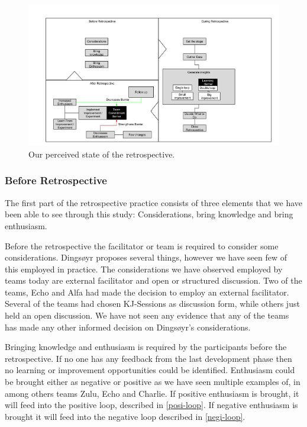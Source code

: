 \begin{figure}
	\centering
	\includegraphics[width=\textwidth, keepaspectratio]{figures/retro-outcome.png}
	\caption{Our perceived state of the retrospective.}
	\label{figure:retro-current-state}
\end{figure}

\subsubsection{Before Retrospective}
The first part of the retrospective practice consists of three elements that we have been able to see through this study: Considerations, bring knowledge and bring enthusiasm. 

Before the retrospective the facilitator or team is required to consider some considerations. Dingsøyr \cite{Dingsoyr2004} proposes several things, however we have seen few of this employed in practice. The considerations we have observed employed by teams today are external facilitator and open or structured discussion. Two of the teams, Echo and Alfa had made the decision to employ an external facilitator. Several of the teams had chosen KJ-Sessions as discussion form, while others just held an open discussion. We have not seen any evidence that any of the teams has made any other informed decision on Dingsøyr's considerations. 

Bringing knowledge and enthusiasm is required by the participants before the retrospective. If no one has any feedback from the last development phase then no learning or improvement opportunities could be identified. Enthusiasm could be brought either as negative or positive as we have seen multiple examples of, in among others teams Zulu, Echo and Charlie. If positive enthusiasm is brought, it will feed into the positive loop, described in \autoref{posi-loop}. If negative enthusiasm is brought it will feed into the negative loop described in \autoref{negi-loop}. 

